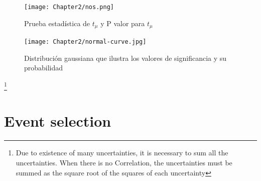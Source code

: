 \begin{linenumbers}
\begin{center}
\begin{figure}
\texttt{[image: Chapter2/nos.png]}
\caption{Prueba estad\'istica de $t_\mu$ y P valor para $t_\mu$}
\end{figure}
\end{center}

\begin{center}
\begin{figure}
\texttt{[image: Chapter2/normal-curve.jpg]}
\caption{Distribuci\'on gaussiana que ilustra los valores de significancia y su probabilidad}
\end{figure}
\end{center}





\footnote[1]{Due to existence of many uncertainties, it is necessary to sum all the uncertainties. When there is no Correlation, the uncertainties must be summed as the square root of the squares of each uncertainty}

\section{Event selection}

\end{linenumbers}
